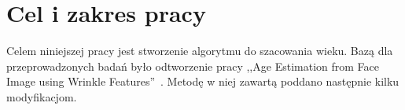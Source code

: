 \documentclass[a4paper,twoside,12pt]{book}
\begin{document}
    \section*{Cel i zakres pracy}\label{sec:cel-i-zakres-pracy}
    Celem niniejszej pracy jest stworzenie algorytmu do szacowania wieku.
    Bazą dla przeprowadzonych badań było odtworzenie pracy ,,Age Estimation from Face Image using Wrinkle
    Features''~\cite{wrinkleFeatures}. Metodę w niej zawartą poddano następnie kilku modyfikacjom.
\end{document}
